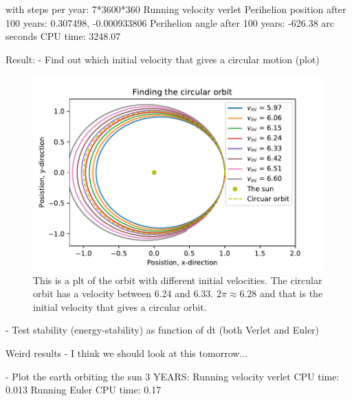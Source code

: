with steps per year: 7*3600*360
Running velocity verlet
Perihelion position after 100 years: 0.307498, -0.000933806
Perihelion angle after 100 years: -626.38 arc seconds
CPU time: 3248.07


Result:		
	- Find out which initial velocity that gives a circular motion (plot)
\begin{figure}[H]
\includegraphics[width=1.1\linewidth]{../results/plots/circular_orbit.pdf}\caption{This is a plt of the orbit with different initial velocities. The circular orbit has a velocity between 6.24 and 6.33. $2 \pi \approx 6.28$ and that is the initial velocity that gives a circular orbit. }\label{fig:circular_orbit}
\end{figure}

	- Test stability (energy-stability) as function of dt (both Verlet and Euler)

Weird results - I think we should look at this tomorrow...	
	
	- Plot the earth orbiting the sun
3 YEARS:
Running velocity verlet
CPU time: 0.013
Running Euler
CPU time: 0.17
		
